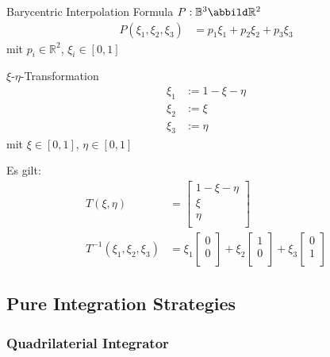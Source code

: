 \documentclass{mitschrift}
\begin{document}
Barycentric Interpolation Formula $P: \mathbb{B}^3 \abbild \mathbb{R}^2$ \begin{align}
    P(\xi_1,\xi_2,\xi_3) &= p_1 \xi_1 + p_2 \xi_2 + p_3 \xi_3
\end{align} mit $p_i \in \mathbb{R}^2$, $\xi_i \in [0,1]$

$\xi$-$\eta$-Transformation \begin{align}
    \xi_1 &:=  1 - \xi - \eta  \\
    \xi_2 &:= \xi\\
    \xi_3 &:=  \eta
\end{align} mit $\xi \in [0,1],\, \eta \in [0,1]$

Es gilt: \begin{align}
    T(\xi, \eta) &= \begin{bmatrix}
        1 - \xi - \eta \\
        \xi \\
        \eta \\
    \end{bmatrix} \\
    T^{-1}(\xi_1,\xi_2,\xi_3) &= \xi_1 \begin{bmatrix}
        0\\
        0\\
    \end{bmatrix} + \xi_2 \begin{bmatrix}
        1\\
        0\\
    \end{bmatrix} + \xi_3 \begin{bmatrix}
        0\\
        1\\
    \end{bmatrix}
\end{align}

\subsection{Pure Integration Strategies}

\subsubsection{Quadrilaterial Integrator}
\end{document}
